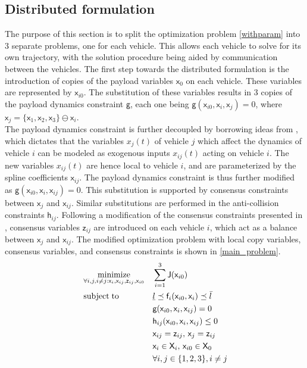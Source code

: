 \documentclass[letterpaper, 10 pt, conference]{ieeeconf}
\newcommand{\ubar}[1]{\text{\b{$#1$}}}
\DeclareMathOperator*{\minimize}{minimize}
\DeclareMathOperator*{\subj}{subject\;to}
\newcommand{\cx}{\textsf{x}}
\newcommand{\cz}{\textsf{z}}
\newcommand{\J}{\textsf{J}}
\newcommand{\cf}{\textsf{f}}
\newcommand{\cg}{\textsf{g}}
\newcommand{\ch}{\textsf{h}}
\newcommand{\X}{\textsf{X}}
\begin{document}
 \subsection{Distributed formulation}
 The purpose of this section is to split the optimization problem \eqref{withparam} into 3 separate problems, one for each vehicle. This allows each vehicle to solve for its own trajectory, with the solution procedure being aided by communication between the vehicles. The first step towards the distributed formulation is the introduction of copies of the payload variables $\cx_0$ on each vehicle. These variables are represented by $\cx_{i0}$. The substitution of these variables results in 3 copies of the payload dynamics constraint $\cg$, each one being $\cg(\cx_{i0},\cx_i,\cx_j) = 0$, where $\cx_j = \{\cx_1,\cx_2,\cx_3\}\ominus \cx_i$.
 \\ \indent
 The payload dynamics constraint is further decoupled by borrowing ideas from \cite{c11}, which dictates that the variables $x_{j}(t)$ of vehicle $j$ which affect the dynamics of vehicle $i$ can be modeled as exogenous inputs $x_{ij}(t)$ acting on vehicle $i$. The new variables $x_{ij}(t)$ are hence local to vehicle $i$, and are parameterized by the spline coefficients $\cx_{ij}$. The payload dynamics constraint is thus further modified as $\cg(\cx_{i0},\cx_i,\cx_{ij}) = 0$. This substitution is supported by consensus constraints between  $\cx_{j}$ and $\cx_{ij}$. Similar substitutions are performed in the anti-collision constraints $\ch_{ij}$. Following a modification of the consensus constraints presented in \cite{c9}, consensus variables $\cz_{ij}$ are introduced on each vehicle $i$, which act as a balance between $\cx_{j}$ and $\cx_{ij}$. The modified optimization problem with local copy variables, consensus variables, and consensus constraints is shown in \eqref{main_problem}.
   \begin{equation}
     \label{main_problem}
     \begin{aligned}
       & \minimize_{\forall i,j,i \neq j:\cx_i,\cx_{ij},\cz_{ij},\cx_{i0}} &&  \sum\limits_{i=1}^{3}\J(\cx_{i0}) \\
       & \subj
       && \ubar{l} \preceq \cf_i(\cx_{i0},\cx_i) \preceq \bar{l}\\
       &       && \cg(\cx_{i0},\cx_i,\cx_{ij}) = 0 \\
       &        && \ch_{ij}(\cx_{i0},\cx_i,\cx_{ij}) \leq 0 \\
       &         && \cx_{ij} = \cz_{ij},\, \cx_{j} = \cz_{ij} \\
       &        && \cx_i \in \X_i,\, \cx_{i0} \in \X_0 \\
       &                                && \forall i,j \in \{1,2,3\}, i \neq j
     \end{aligned}
   \end{equation}
\end{document}
